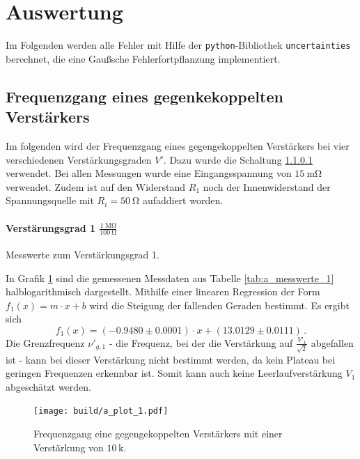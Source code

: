 \section{Auswertung}
\label{sec:auswertung}
Im Folgenden werden alle Fehler mit Hilfe der \texttt{python}-Bibliothek
\texttt{uncertainties}\cite{py-uncertainties} berechnet, die eine Gaußsche
Fehlerfortpflanzung implementiert.

\subsection{Frequenzgang eines gegenkekoppelten Verstärkers} %

Im folgenden wird der Frequenzgang eines gegengekoppelten Verstärkers bei vier verschiedenen Verstärkungsgraden $V'$.
Dazu wurde die Schaltung \ref{} verwendet.
Bei allen Messungen wurde eine Eingangsspannung von $\SI{15}{\milli\ohm}$ verwendet.
Zudem ist auf den Widerstand $R_1$ noch der Innenwiderstand der Spannungsquelle mit $R_i = \SI{50}{\ohm}$ aufaddiert worden.

\paragraph{Verstärungsgrad 1 $\frac{\SI{1}{\mega\ohm}}{\SI{100}{\ohm}}$}

\begin{table}
\centering
\caption{Messwerte zum Verstärkungsgrad 1.}
    \label{tab:a_messwerte_1}
    
\end{table}

In Grafik \ref{fig:a_plot_1} sind die gemessenen Messdaten aus Tabelle \ref{tab:a_messwerte_1} halblogarithmisch dargestellt.
Mithilfe einer linearen Regression der Form $f_1(x)=m \cdot x + b$ wird die Steigung der fallenden Geraden bestimmt.
Es ergibt sich
\begin{equation*}
	f_1(x) = (-0.9480\pm0.0001) \cdot x + (13.0129\pm0.0111)\,.
\end{equation*}
Die Grenzfrequenz $\nu'_{g,1}$ - die Frequenz, bei der die Verstärkung auf $\frac{V'_1}{\sqrt{2}}$ abgefallen ist - kann bei dieser Verstärkung nicht bestimmt werden, da kein Plateau bei geringen Frequenzen erkennbar ist.
Somit kann auch keine Leerlaufverstärkung $V_1$ abgeschätzt werden.

\begin{figure}[h!]
    \centering
    \texttt{[image: build/a\_plot\_1.pdf]}
    \caption{Frequenzgang eine gegengekoppelten Verstärkers mit einer Verstärkung von $10\,\mathrm{k}$.}
    \label{fig:a_plot_1}
\end{figure}

